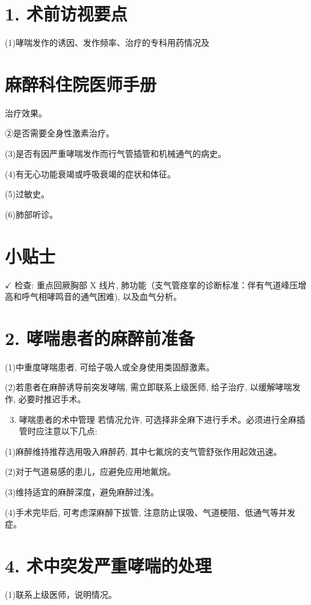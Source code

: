 \documentclass[10pt]{article}
\begin{document}
\section*{1. 术前访视要点}
(1)哮喘发作的诱因、发作频率、治疗的专科用药情况及

\section*{麻醉科住院医师手册}
治疗效果。

②是否需要全身性激素治疗。

(3)是否有因严重哮喘发作而行气管插管和机械通气的病史。

(4)有无心功能衰竭或呼吸衰竭的症状和体征。

(5)过敏史。

(6)肺部听诊。

\section*{小贴士}
$\checkmark$ 检查: 重点回厥胸部 $\mathrm{X}$ 线片, 肺功能（支气管痉挛的诊断标准：伴有气道峰压增高和呼气相哮鸣音的通气困难), 以及血气分析。

\section*{2. 哮喘患者的麻醉前准备}
(1)中重度哮喘患者, 可给子吸人或全身使用类固醇激素。

(2)若患者在麻醉诱导前突发哮喘, 需立即联系上级医师, 给子治疗, 以缓解哮喘发作, 必要时推迟手术。

\begin{enumerate}
  \setcounter{enumi}{2}
  \item 哮喘患者的术中管理 若情况允许, 可选择非全麻下进行手术。必须进行全麻插管时应注意以下几点:
\end{enumerate}

(1)麻醉维持推荐选用吸入麻醉药, 其中七氟烷的支气管舒张作用起效迅速。

(2)对于气道易感的患儿，应避免应用地氟烷。

(3)维持适宜的麻醉深度，避免麻醉过浅。

(4)手术完毕后, 可考虑深麻醉下拔管, 注意防止误吸、气道梗阻、低通气等并发症。

\section*{4. 术中突发严重哮喘的处理}
(1)联系上级医师，说明情况。
\end{document}
